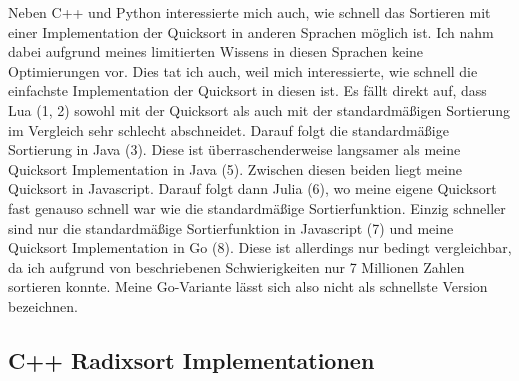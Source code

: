 \documentclass[11pt,a4paper]{article}
\begin{document}
\begin{bchart}[min=0, max=15, scale=1.9]
    \smallskip
    \smallskip
    \smallskip
    \smallskip
    \smallskip
    \smallskip
    \smallskip
    \smallskip
\end{bchart}

Neben C++ und Python interessierte mich auch, wie schnell das Sortieren mit
einer Implementation der Quicksort in anderen Sprachen möglich ist.
Ich nahm dabei aufgrund meines limitierten Wissens in diesen Sprachen keine Optimierungen
vor. Dies tat ich auch, weil mich interessierte, wie schnell die einfachste
Implementation der Quicksort in diesen ist.
Es fällt direkt auf, dass Lua (1, 2) sowohl mit der Quicksort als auch mit der
standardmäßigen Sortierung im Vergleich sehr schlecht abschneidet.
Darauf folgt die standardmäßige Sortierung in Java (3).
Diese ist überraschenderweise langsamer als meine Quicksort Implementation in Java (5).
Zwischen diesen beiden liegt meine Quicksort in Javascript.
Darauf folgt dann Julia (6), wo meine eigene Quicksort fast genauso schnell war wie
die standardmäßige Sortierfunktion.
Einzig schneller sind nur die standardmäßige Sortierfunktion in Javascript (7) und meine
Quicksort Implementation in Go (8). Diese ist allerdings nur bedingt vergleichbar, da ich
aufgrund von beschriebenen Schwierigkeiten nur 7 Millionen Zahlen sortieren konnte.
Meine Go-Variante lässt sich also nicht als schnellste Version bezeichnen.


\subsection{C++ Radixsort Implementationen}

\begin{bchart}[min=0, max=2.5, scale=1.9]
    \smallskip
    \smallskip
    \smallskip
    \smallskip
\end{bchart}
\end{document}
